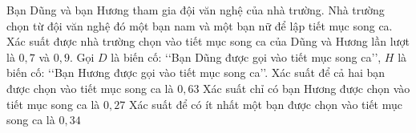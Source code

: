 \begin{ex}%
	Bạn Dũng và bạn Hương tham gia đội văn nghệ của nhà trường. Nhà trường chọn từ đội văn nghệ đó một bạn nam và một bạn nữ để lập tiết mục song ca. Xác suất được nhà trường chọn vào tiết mục song ca của Dũng và Hương lần lượt là $0{,}7$ và $0{,}9$. Gọi $D$ là biến cố: \lq\lq Bạn Dũng được gọi vào tiết mục song ca\rq\rq, $H$ là biến cố: \lq\lq Bạn Hương được gọi vào tiết mục song ca\rq\rq.
	{\True Xác suất để cả hai bạn được chọn vào tiết mục song ca là $0{,}63$}
	{\True Xác suất chỉ có bạn Hương được chọn vào tiết mục song ca là $0{,}27$}
	{Xác suất để có ít nhất một bạn được chọn vào tiết mục song ca là $0{,}34$}

\end{ex}


